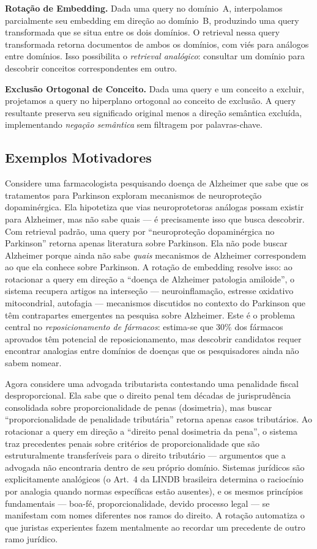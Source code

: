\documentclass{article}
\begin{document}
\textbf{Rotação de Embedding.} Dada uma query no domínio~A, interpolamos parcialmente seu embedding em direção ao domínio~B, produzindo uma query transformada que se situa entre os dois domínios. O retrieval nessa query transformada retorna documentos de ambos os domínios, com viés para análogos entre domínios. Isso possibilita o \emph{retrieval analógico}: consultar um domínio para descobrir conceitos correspondentes em outro.

\textbf{Exclusão Ortogonal de Conceito.} Dada uma query e um conceito a excluir, projetamos a query no hiperplano ortogonal ao conceito de exclusão. A query resultante preserva seu significado original menos a direção semântica excluída, implementando \emph{negação semântica} sem filtragem por palavras-chave.

\subsection{Exemplos Motivadores}

Considere uma farmacologista pesquisando doença de Alzheimer que sabe que os tratamentos para Parkinson exploram mecanismos de neuroproteção dopaminérgica. Ela hipotetiza que vias neuroprotetoras análogas possam existir para Alzheimer, mas não sabe quais --- é precisamente isso que busca descobrir. Com retrieval padrão, uma query por ``neuroproteção dopaminérgica no Parkinson'' retorna apenas literatura sobre Parkinson. Ela não pode buscar Alzheimer porque ainda não sabe \emph{quais} mecanismos de Alzheimer correspondem ao que ela conhece sobre Parkinson. A rotação de embedding resolve isso: ao rotacionar a query em direção a ``doença de Alzheimer patologia amiloide'', o sistema recupera artigos na interseção --- neuroinflamação, estresse oxidativo mitocondrial, autofagia --- mecanismos discutidos no contexto do Parkinson que têm contrapartes emergentes na pesquisa sobre Alzheimer. Este é o problema central no \emph{reposicionamento de fármacos}: estima-se que 30\% dos fármacos aprovados têm potencial de reposicionamento, mas descobrir candidatos requer encontrar analogias entre domínios de doenças que os pesquisadores ainda não sabem nomear.

Agora considere uma advogada tributarista contestando uma penalidade fiscal desproporcional. Ela sabe que o direito penal tem décadas de jurisprudência consolidada sobre proporcionalidade de penas (dosimetria), mas buscar ``proporcionalidade de penalidade tributária'' retorna apenas casos tributários. Ao rotacionar a query em direção a ``direito penal dosimetria da pena'', o sistema traz precedentes penais sobre critérios de proporcionalidade que são estruturalmente transferíveis para o direito tributário --- argumentos que a advogada não encontraria dentro de seu próprio domínio. Sistemas jurídicos são explicitamente analógicos (o Art.~4 da LINDB brasileira determina o raciocínio por analogia quando normas específicas estão ausentes), e os mesmos princípios fundamentais --- boa-fé, proporcionalidade, devido processo legal --- se manifestam com nomes diferentes nos ramos do direito. A rotação automatiza o que juristas experientes fazem mentalmente ao recordar um precedente de outro ramo jurídico.
\end{document}
